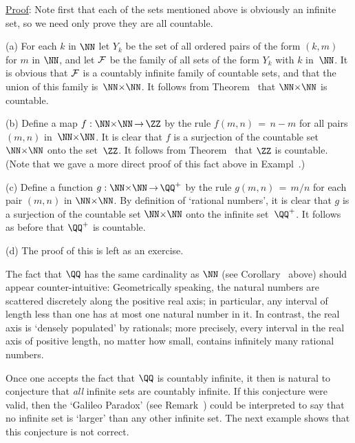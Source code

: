 \V

        \underline{Proof}: Note first that each of the sets mentioned above is obviously an infinite set, so we need only prove they are all countable.

\V

        (a) For each $k$ in ${\NN}$ let $Y_{k}$ be the set of all ordered pairs of the form $(k,m)$ for $m$ in ${\NN}$,
    and let ${\cal F}$ be the family of all sets of the form $Y_{k}$ with $k$ in~${\NN}$.
    It is obvious that ${\cal F}$ is a countably infinite family of countable sets, and that the union of this family is~${\NN}{\times}{\NN}$.
    It follows from Theorem~ that ${\NN}{\times}{\NN}$ is countable.

\V

        (b) Define a map $f:{\NN}{\times}{\NN} \,{\rightarrow}\, {\ZZ}$ by the rule $f(m,n) \,=\, n-m$ for all pairs $(m,n)$ in~${\NN}{\times}{\NN}$.
    It is clear that $f$ is a surjection of the countable set ${\NN}{\times}{\NN}$ onto the set~${\ZZ}$.
    It follows from Theorem~ that ${\ZZ}$ is countable. (Note that we gave a more direct proof of this fact above in Exampl~.)

\V

        (c) Define a function $g:{\NN}{\times}{\NN} \,{\rightarrow}\, {\QQ}^{+}$ by the rule $g(m,n) \,=\, m/n$ for each pair $(m,n)$ in ${\NN}{\times}{\NN}$.
    By definition of `rational numbers', it is clear that $g$ is a surjection of the countable set ${\NN}{\times}{\NN}$ onto the infinite set~${\QQ}^{+}$.
    It follows as before that ${\QQ}^{+}$ is countable.

\V

        (d) The proof of this is left as an exercise. %


\VV


        The fact that ${\QQ}$ has the same cardinality as ${\NN}$ (see Corollary~ above) should appear counter-intuitive:
    Geometrically speaking, the natural numbers are scattered discretely along the positive real axis;
    in particular, any interval of length less than one has at most one natural number in it.
    In contrast, the real axis is `densely populated' by rationals; more precisely,
    every interval in the real axis of positive length, no matter how small, contains infinitely many rational numbers.

        Once one accepts the fact that ${\QQ}$ is countably infinite, it then is natural to conjecture that {\em all} infinite sets are countably infinite.
    If this conjecture were valid, then the `Galileo Paradox' (see Remark~)
    could be interpreted to say that no infinite set is `larger' than any other infinite set. The next example shows that this conjecture is not correct.

